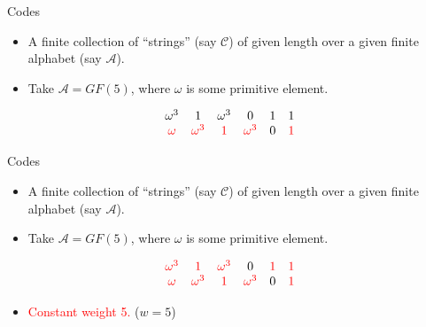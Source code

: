 \documentclass{beamer}
\newcommand{\A}{\mathcal{A}}
\newcommand{\C}{\mathscr{C}}
\newcommand{\rred}[1]{\textcolor{red}{#1}}
\begin{document}

\begin{frame}{Codes}

 \begin{itemize}
  \item A finite collection of ``strings'' (say $\C$) of given length over a given finite alphabet (say $\A$).
  \item Take $\A = GF(5)$, where $\omega$ is some primitive element.
 \end{itemize}
 
 \[
  \begin{array}{cccccc}
\omega^3 & 1 & \omega^3 & 0 & 1 & 1 \\ 
\rred{\omega} & \rred{\omega^3} & \rred{1} & \rred{\omega^3} & 0 & \rred{1}
  \end{array}
 \]

 \end{frame}

 
 \begin{frame}{Codes}
 
 \begin{itemize}
  \item A finite collection of ``strings'' (say $\C$) of given length over a given finite alphabet (say $\A$).
  \item Take $\A = GF(5)$, where $\omega$ is some primitive element.
 \end{itemize}
 
 \[
  \begin{array}{cccccc}
\rred{\omega^3} & \rred{1} & \rred{\omega^3} & 0 & \rred{1} & \rred{1} \\
\rred{\omega} & \rred{\omega^3} & \rred{1} & \rred{\omega^3} & 0 & \rred{1}
  \end{array}
 \]
 
 \begin{itemize}
  \item \rred{Constant weight 5.} ($w=5$)
 \end{itemize}
 
 \end{frame}

 
\end{document}
